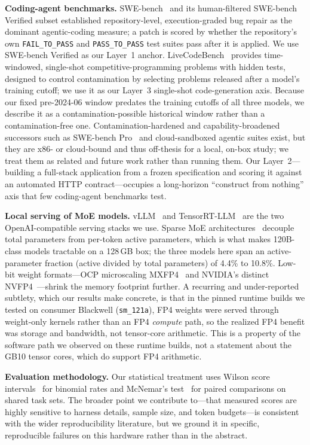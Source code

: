 \documentclass[10pt,twocolumn]{article}
\newcommand{\code}[1]{\texttt{\small #1}}
\begin{document}
\textbf{Coding-agent benchmarks.} SWE-bench~\cite{swebench} and its human-filtered
SWE-bench Verified subset established repository-level, execution-graded bug repair as the
dominant agentic-coding measure; a patch is scored by whether the repository's own
\code{FAIL\_TO\_PASS} and \code{PASS\_TO\_PASS} test suites pass after it is applied. We use
SWE-bench Verified as our Layer~1 anchor. LiveCodeBench~\cite{livecodebench} provides
time-windowed, single-shot competitive-programming problems with hidden tests, designed to
control contamination by selecting problems released after a model's training cutoff; we use
it as our Layer~3 single-shot code-generation axis. Because our fixed pre-2024-06 window
predates the training cutoffs of all three models, we describe it as a contamination-possible
historical window rather than a contamination-free one. Contamination-hardened and
capability-broadened successors such as SWE-bench Pro~\cite{swebenchpro} and cloud-sandboxed
agentic suites exist, but they are x86- or cloud-bound and thus off-thesis for a local, on-box study; we
treat them as related and future work rather than running them. Our Layer~2---building a
full-stack application from a frozen specification and scoring it against an automated HTTP
contract---occupies a long-horizon ``construct from nothing'' axis that few coding-agent
benchmarks test.

\textbf{Local serving of MoE models.} vLLM~\cite{vllm} and TensorRT-LLM~\cite{trtllm} are the
two OpenAI-compatible serving stacks we use. Sparse MoE architectures~\cite{switch} decouple
total parameters from per-token active parameters, which is what makes 120B-class models
tractable on a 128\,GB box; the three models here span an active-parameter fraction (active
divided by total parameters) of 4.4\% to 10.8\%. Low-bit weight formats---OCP microscaling
MXFP4~\cite{mxfp4} and NVIDIA's distinct NVFP4~\cite{nvfp4}---shrink the memory footprint
further. A recurring and under-reported subtlety, which our results make concrete, is that in
the pinned runtime builds we tested on consumer Blackwell (\code{sm\_121a}), FP4 weights were
served through weight-only kernels rather than an FP4 \emph{compute} path, so the realized FP4
benefit was storage and bandwidth, not tensor-core arithmetic. This is a property of the
software path we observed on these runtime builds, not a statement about the GB10 tensor
cores, which do support FP4 arithmetic.

\textbf{Evaluation methodology.} Our statistical treatment uses Wilson score
intervals~\cite{wilson} for binomial rates and McNemar's test~\cite{mcnemar} for paired
comparisons on shared task sets. The broader point we contribute to---that measured scores
are highly sensitive to harness details, sample size, and token budgets---is consistent with
the wider reproducibility literature, but we ground it in specific, reproducible failures on
this hardware rather than in the abstract.
\end{document}
